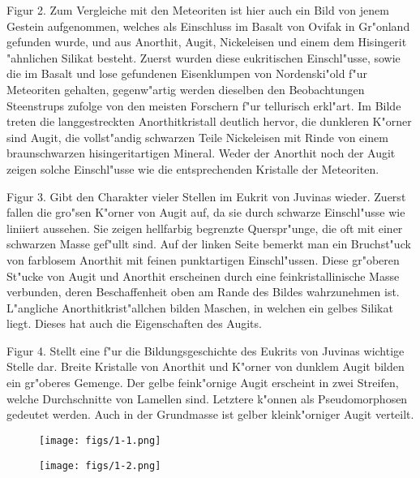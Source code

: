 \documentclass[a4paper, 11pt, oneside, polutonikogreek, german]{article}
\begin{document}
Figur 2. Zum Vergleiche mit den Meteoriten ist hier auch ein Bild von jenem Gestein aufgenommen, welches als Einschluss im Basalt von Ovifak in Gr"onland gefunden wurde, und aus Anorthit, Augit, Nickeleisen und einem dem Hisingerit "ahnlichen Silikat besteht. Zuerst wurden diese eukritischen Einschl"usse, sowie die im Basalt und lose gefundenen Eisenklumpen von Nordenski"old f"ur Meteoriten gehalten, gegenw"artig werden dieselben den Beobachtungen Steenstrups zufolge von den meisten Forschern f"ur tellurisch erkl"art. Im Bilde treten die langgestreckten Anorthitkristall deutlich hervor, die dunkleren K"orner sind Augit, die vollst"andig schwarzen Teile Nickeleisen mit Rinde von einem braunschwarzen hisingeritartigen Mineral. Weder der Anorthit noch der Augit zeigen solche Einschl"usse wie die entsprechenden Kristalle der Meteoriten.

Figur 3. Gibt den Charakter vieler Stellen im Eukrit von Juvinas wieder. Zuerst fallen die gro"sen K"orner von Augit auf, da sie durch schwarze Einschl"usse wie liniiert aussehen. Sie zeigen hellfarbig begrenzte Querspr"unge, die oft mit einer schwarzen Masse gef"ullt sind. Auf der linken Seite bemerkt man ein Bruchst"uck von farblosem Anorthit mit feinen punktartigen Einschl"ussen. Diese gr"oberen St"ucke von Augit und Anorthit erscheinen durch eine feinkristallinische Masse verbunden, deren Beschaffenheit oben am Rande des Bildes wahrzunehmen ist. L"angliche Anorthitkrist"allchen bilden Maschen, in welchen ein gelbes Silikat liegt. Dieses hat auch die Eigenschaften des Augits.

Figur 4. Stellt eine f"ur die Bildungsgeschichte des Eukrits von Juvinas wichtige Stelle dar. Breite Kristalle von Anorthit und K"orner von dunklem Augit bilden ein gr"oberes Gemenge. Der gelbe feink"ornige Augit erscheint in zwei Streifen, welche Durchschnitte von Lamellen sind. Letztere k"onnen als Pseudomorphosen gedeutet werden. Auch in der Grundmasse ist gelber kleink"orniger Augit verteilt.
\clearpage

\cfoot{\thepage}
\vspace*{\fill}
\begin{figure}[H]
\centering
\texttt{[image: figs/1-1.png]}
\caption{}
\end{figure}
\vspace*{\fill}
\clearpage

\vspace*{\fill}
\begin{figure}[H]
\centering
\texttt{[image: figs/1-2.png]}
\caption{}
\end{figure}
\vspace*{\fill}
\clearpage
\end{document}
